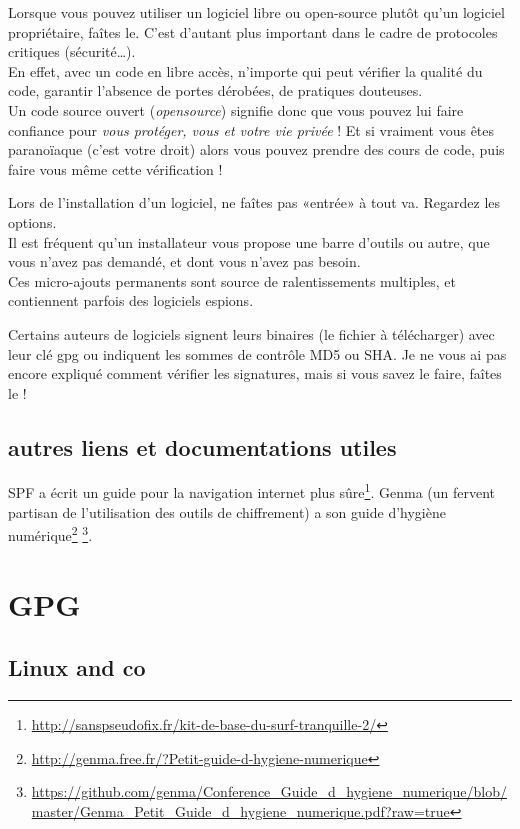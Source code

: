 Lorsque vous pouvez utiliser un logiciel libre ou open-source plutôt
qu'un logiciel propriétaire, faîtes le. C'est d'autant plus important
dans le cadre de protocoles critiques (sécurité\ldots{}).\\En effet,
avec un code en libre accès, n'importe qui peut vérifier la qualité du
code, garantir l'absence de portes dérobées, de pratiques douteuses.\\Un
code source ouvert (\emph{opensource}) signifie donc que vous pouvez lui
faire confiance pour \emph{vous protéger, vous et votre vie privée} ! Et
si vraiment vous êtes paranoïaque (c'est votre droit) alors vous pouvez
prendre des cours de code, puis faire vous même cette vérification !

Lors de l'installation d'un logiciel, ne faîtes pas «entrée» à tout va.
Regardez les options.\\Il est fréquent qu'un installateur vous propose
une barre d'outils ou autre, que vous n'avez pas demandé, et dont vous
n'avez pas besoin.\\Ces micro-ajouts permanents sont source de
ralentissements multiples, et contiennent parfois des logiciels espions.

Certains auteurs de logiciels signent leurs binaires (le fichier à
télécharger) avec leur clé gpg ou indiquent les sommes de contrôle MD5
ou SHA. Je ne vous ai pas encore expliqué comment vérifier les
signatures, mais si vous savez le faire, faîtes le !

\subsection{autres liens et documentations utiles}

SPF a écrit un guide pour la navigation internet plus sûre\footnote{\url{http://sanspseudofix.fr/kit-de-base-du-surf-tranquille-2/}}.
Genma (un fervent partisan de l'utilisation des outils de chiffrement) a son guide d'hygiène numérique\footnote{\url{http://genma.free.fr/?Petit-guide-d-hygiene-numerique}} \footnote{\url{https://github.com/genma/Conference_Guide_d_hygiene_numerique/blob/master/Genma_Petit_Guide_d_hygiene_numerique.pdf?raw=true}}.

\section{GPG}\label{gpg}

\subsection{Linux and co}\label{linux-and-co}

